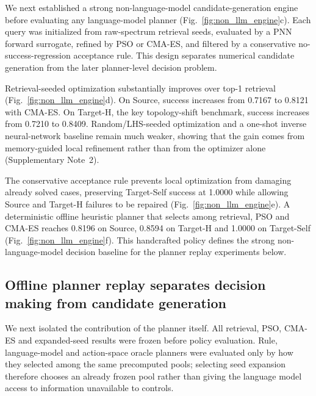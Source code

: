 \documentclass[final,1p,times]{elsarticle}
\begin{document}
We next established a strong non-language-model candidate-generation engine before evaluating any language-model planner (Fig.~\ref{fig:non_llm_engine}c). Each query was initialized from raw-spectrum retrieval seeds, evaluated by a PNN forward surrogate, refined by PSO or CMA-ES, and filtered by a conservative no-success-regression acceptance rule. This design separates numerical candidate generation from the later planner-level decision problem.

Retrieval-seeded optimization substantially improves over top-1 retrieval (Fig.~\ref{fig:non_llm_engine}d). On Source, success increases from 0.7167 to 0.8121 with CMA-ES. On Target-H, the key topology-shift benchmark, success increases from 0.7210 to 0.8409. Random/LHS-seeded optimization and a one-shot inverse neural-network baseline remain much weaker, showing that the gain comes from memory-guided local refinement rather than from the optimizer alone (Supplementary Note~2).

The conservative acceptance rule prevents local optimization from damaging already solved cases, preserving Target-Self success at 1.0000 while allowing Source and Target-H failures to be repaired (Fig.~\ref{fig:non_llm_engine}e). A deterministic offline heuristic planner that selects among retrieval, PSO and CMA-ES reaches 0.8196 on Source, 0.8594 on Target-H and 1.0000 on Target-Self (Fig.~\ref{fig:non_llm_engine}f). This handcrafted policy defines the strong non-language-model decision baseline for the planner replay experiments below.




\subsection{Offline planner replay separates decision making from candidate generation}

We next isolated the contribution of the planner itself. All retrieval, PSO, CMA-ES and expanded-seed results were frozen before policy evaluation. Rule, language-model and action-space oracle planners were evaluated only by how they selected among the same precomputed pools; selecting seed expansion therefore chooses an already frozen pool rather than giving the language model access to information unavailable to controls.
\end{document}
